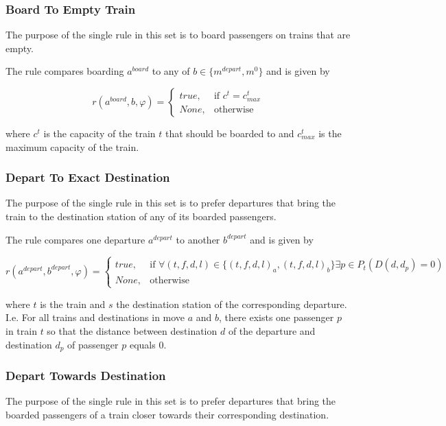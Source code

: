 \documentclass[a4paper,10pt,parskip]{article}
\begin{document}
\subsubsection{Board To Empty Train}
\label{rule:5}

The purpose of the single rule in this set is to board passengers on trains that 
are empty.

The rule compares boarding $a^{board}$ to any of $b \in \{m^{depart}, m^0\}$ and 
is given by 

\[
    r(a^{board}, b, \varphi) = 
    \begin{cases}
        true,& \text{if } c^t = c^t_{max}\\
        None,& \text{otherwise}
    \end{cases}
\]

where $c^t$ is the capacity of the train $t$ that should be boarded to and 
$c^t_{max}$ is the maximum capacity of the train.

\subsubsection{Depart To Exact Destination}
\label{rule:6}

The purpose of the single rule in this set is to prefer departures that bring the 
train to the destination station of any of its boarded passengers.

The rule compares one departure $a^{depart}$ to another $b^{depart}$ and is 
given by 

\[
    r(a^{depart}, b^{depart}, \varphi) = 
    \begin{cases}
        true,& \text{if } \forall (t,f,d,l) \in \{(t,f,d,l)_a, (t,f,d,l)_b\} \exists p \in P_t (D(d, d_p) = 0)\\
        None,& \text{otherwise}
    \end{cases}
\]

\noindent where $t$ is the train and $s$ the destination station of the corresponding 
departure. I.e. For all trains and destinations in move $a$ and $b$, there exists 
one passenger $p$ in train $t$ so that the distance between destination $d$ of 
the departure and destination $d_p$ of passenger $p$ equals $0$.

\subsubsection{Depart Towards Destination}
\label{rule:7}

The purpose of the single rule in this set is to prefer departures that bring the 
boarded passengers of a train closer towards their corresponding destination.
\end{document}
